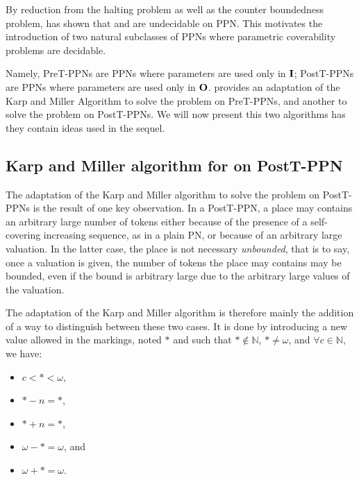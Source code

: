 \label{sec:preliminaries-ppn}

By reduction from the halting problem as well as the counter boundedness problem, \cite{David17} has shown that \Ucov and \Ecov are undecidable on \ac{PPN}.
This motivates the introduction of two natural subclasses of \acp{PPN} where parametric coverability problems are decidable.

Namely,
PreT-PPNs are \acp{PPN} where parameters are used only in $\mathbf{I}$;
PostT-PPNs are \acp{PPN} where parameters are used only in $\mathbf{O}$.
\cite{David17} provides an adaptation of the Karp and Miller Algorithm to solve the \Ucov problem on PreT-\acp{PPN}, and another to solve the \Ecov problem on PostT-\acp{PPN}.
We will now present this two algorithms has they contain ideas used in the sequel.

\subsection{Karp and Miller algorithm for \Ecov on PostT-\ac{PPN}}

The adaptation of the Karp and Miller algorithm to solve the \Ecov problem on PostT-\acp{PPN} is the result of one key observation.
In a PostT-\ac{PPN}, a place may contains an arbitrary large number of tokens either because of the presence of a self-covering increasing sequence, as in a plain \ac{PN}, or because of an arbitrary large valuation.
In the latter case, the place is not necessary \emph{unbounded}, that is to say, once a valuation is given, the number of tokens the place may contains may be bounded, even if the bound is arbitrary large due to the arbitrary large values of the valuation.

The adaptation of the Karp and Miller algorithm is therefore mainly the addition of a way to distinguish between these two cases.
It is done by introducing a new value allowed in the markings, noted $*$ and such that $* \notin \mathbb{N}$, $* \neq \omega$, and $\forall c \in \mathbb{N}$, we have:
\begin{itemize}
  \item $c < * < \omega$,
  \item $* - n = *$,
  \item $* + n = *$,
  \item $\omega - * = \omega$, and
  \item $\omega + * = \omega$.
\end{itemize}


